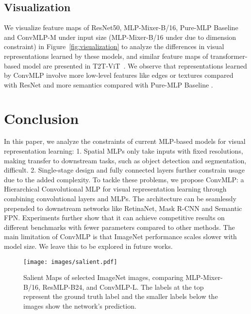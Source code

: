 \documentclass[final]{cvpr}
\begin{document}
\subsection{Visualization}
We visualize feature maps of ResNet50, MLP-Mixer-B/16, Pure-MLP Baseline and ConvMLP-M under  input size (MLP-Mixer-B/16 under  due to dimension constraint) in Figure~\ref{fig:visualization} to analyze the differences in visual representations learned by these models, and similar feature maps of transformer-based model are presented in T2T-ViT~\cite{yuan2021tokens}. We observe that representations learned by ConvMLP involve more low-level features like edges or textures compared with ResNet and more semantics compared with Pure-MLP Baseline .

\section{Conclusion}
In this paper, we analyze the constraints of current MLP-based models for visual representation learning: 1. Spatial MLPs only take inputs with fixed resolutions, making transfer to downstream tasks, such as object detection and segmentation, difficult. 2. Single-stage design and fully connected layers further constrain usage due to the added complexity. To tackle these problems, we propose ConvMLP: a Hierarchical Convolutional MLP for visual representation learning through combining convolutional layers and MLPs. The architecture can be seamlessly prepended to downstream networks like RetinaNet, Mask R-CNN and Semantic FPN. Experiments further show that it can achieve competitive results on different benchmarks with fewer parameters compared to other methods. 
The main limitation of ConvMLP is that ImageNet performance scales slower with model size. We leave this to be explored in future works.

{\small


}

\appendix

\begin{figure*}[htb]
\centering
\texttt{[image: images/salient.pdf]}
\caption{Salient Maps of selected ImageNet images, comparing MLP-Mixer-B/16, ResMLP-B24, and ConvMLP-L. The labels at the top represent the ground truth label and the smaller labels below the images show the network's prediction.}
\label{fig:salient}
\end{figure*}
\end{document}
